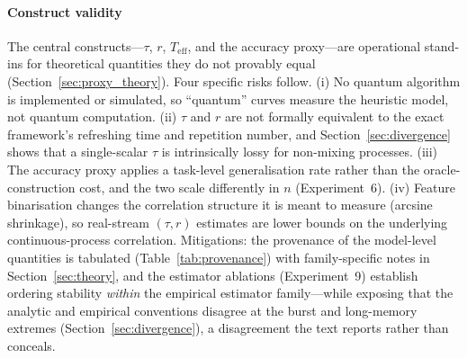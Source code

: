 \documentclass[sensors,article,submit,pdftex,moreauthors]{Definitions/mdpi}
\newcommand{\Teff}{T_{\mathrm{eff}}}
\providecommand{\DIFadd}[1]{{\protect\color{blue}#1}} %
\providecommand{\DIFdel}[1]{} %
\providecommand{\DIFaddbegin}{} %
\providecommand{\DIFaddend}{} %
\providecommand{\DIFdelbegin}{} %
\providecommand{\DIFdelend}{} %
\begin{document}
\paragraph{\DIFadd{Construct validity}} \DIFadd{The central constructs---$\tau$, }\DIFaddend $r$\DIFdelbegin \DIFdel{are paper-defined operational labels }\DIFdelend \DIFaddbegin \DIFadd{, $\Teff$, and the accuracy proxy---are operational stand-ins for theoretical quantities they do not provably equal }\DIFaddend (Section~\DIFdelbegin \DIFdel{\ref{sec:prelim}); equivalence }\DIFdelend \DIFaddbegin \DIFadd{\ref{sec:proxy_theory}). Four specific risks follow. (i) No quantum algorithm is implemented or simulated, so ``quantum'' curves measure the heuristic model, not quantum computation. (ii) $\tau$ and $r$ are not formally equivalent }\DIFaddend to the exact \DIFdelbegin \DIFdel{correlation parameters of }%
\DIFdel{is not proven and is deferred to follow-on work. }%
\textbf{\DIFdel{Classical baselines are practical learners, not lower-bound-hard instances.}} %
\DIFdel{Online SGD, averaged SGD, and Count-Min are standard memory-bounded streaming }\DIFdelend \DIFaddbegin \DIFadd{framework's refreshing time and repetition number, and Section~\ref{sec:divergence} shows that a single-scalar $\tau$ is intrinsically lossy for non-mixing processes. (iii) The accuracy proxy applies a task-level generalisation rate rather than the oracle-construction cost, and the two scale differently in $n$ (Experiment~6). (iv) Feature binarisation changes the correlation structure it is meant to measure (arcsine shrinkage), so real-stream $(\tau, r)$ estimates are lower bounds on the underlying continuous-process correlation. Mitigations: the provenance of the model-level quantities is tabulated (Table~\ref{tab:provenance}) with family-specific notes in Section~\ref{sec:theory}, and the estimator ablations (Experiment~9) establish ordering stability }\emph{\DIFadd{within}} \DIFadd{the empirical estimator family---while exposing that the analytic and empirical conventions disagree at the burst and long-memory extremes (Section~\ref{sec:divergence}), a disagreement the text reports rather than conceals.
}
\end{document}
